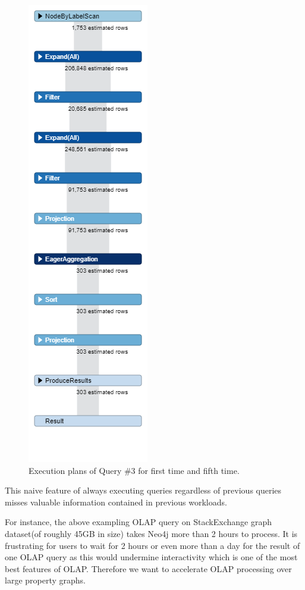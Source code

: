 \begin {figure}[H]
\includegraphics[scale=0.4]{pic/5.png}
\caption{Execution plans of Query \#3 for first time and fifth time.}

\end{figure}

This naive feature of always executing queries regardless of previous queries misses valuable information contained in previous workloads.

For instance, the above exampling OLAP query on StackExchange graph dataset(of roughly 45GB in size) takes Neo4j more than 2 hours to process. It is frustrating for users to wait for 2 hours or even more than a day for the result of one OLAP query as this would undermine interactivity which is one of the most best features of OLAP. Therefore we want to accelerate OLAP processing over large property graphs.

